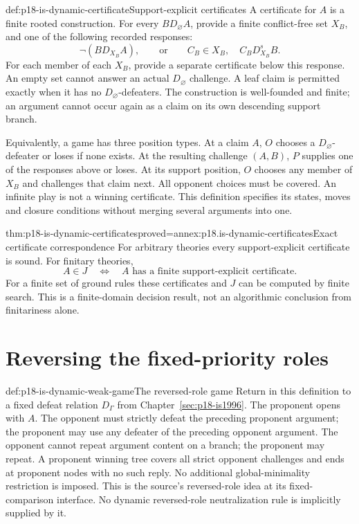 \begin{hbdefinition}{def:p18-is-dynamic-certificate}{Support-explicit certificates}
A certificate for \(A\) is a finite rooted construction. For every
\(B D_\varnothing A\), provide a finite conflict-free set \(X_B\),
and one of the following recorded responses:
\[
 \neg(B D_{X_B} A),\qquad
 \text{or}\qquad C_B\in X_B,\quad C_B D_{X_B}^s B.
\]
For each member of each \(X_B\), provide a separate certificate
below this response. An empty set cannot answer an actual
\(D_\varnothing\) challenge. A leaf claim is permitted exactly
when it has no \(D_\varnothing\)-defeaters. The construction is
well-founded and finite; an argument cannot occur again as a claim
on its own descending support branch.

Equivalently, a game has three position types. At a claim \(A\),
\(O\) chooses a \(D_\varnothing\)-defeater or loses if none exists.
At the resulting challenge \((A,B)\), \(P\) supplies one of the
responses above or loses. At its support position, \(O\) chooses
any member of \(X_B\) and challenges that claim next.
All opponent choices must be covered. An infinite play is not a
winning certificate. This definition specifies its states, moves
and closure conditions without merging several arguments into one.
\end{hbdefinition}

\begin{hbtheorem}{thm:p18-is-dynamic-certificates}{proved=annex:p18.is-dynamic-certificates}{Exact certificate correspondence}
For arbitrary theories every support-explicit certificate is sound.
For finitary theories,
\[
 A\in J\quad\Longleftrightarrow\quad
 A\text{ has a finite support-explicit certificate}.
\]
For a finite set of ground rules these certificates and \(J\) can be
computed by finite search. This is a finite-domain decision result,
not an algorithmic conclusion from finitariness alone.
\end{hbtheorem}

\section{Reversing the fixed-priority roles}

\begin{hbdefinition}{def:p18-is-dynamic-weak-game}{The reversed-role game}
Return in this definition to a fixed defeat relation \(D_\Gamma\)
from Chapter~\ref{sec:p18-is1996}. The proponent opens with \(A\).
The opponent must strictly defeat the preceding proponent argument;
the proponent may use any defeater of the preceding opponent argument.
The opponent cannot repeat argument content on a branch; the
proponent may repeat. A proponent winning tree covers all strict
opponent challenges and ends at proponent nodes with no such reply.
No additional global-minimality restriction is imposed.
This is the source's reversed-role idea at its fixed-comparison
interface. No dynamic reversed-role neutralization rule is
implicitly supplied by it.
\end{hbdefinition}

